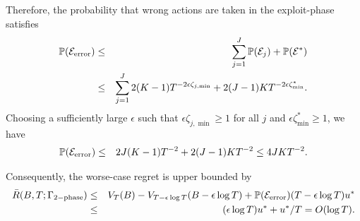 Therefore, the probability that wrong actions are taken in the exploit-phase satisfies
\begin{eqnarray}
\mathbb{P}(\mathcal{E}_{\rm error}) &\leq& \sum_{j=1}^J \mathbb{P}(\mathcal{E}_j) + \mathbb{P}(\mathcal{E}^*)\nonumber \\
&\leq& \sum_{j=1}^J 2(K-1)T^{-2 \epsilon \zeta_{j, \min}} + 2(J-1)K T^{-2\epsilon \zeta^*_{\min}}.
\end{eqnarray}
Choosing a sufficiently large $\epsilon$ such that $\epsilon \zeta_{j, \min} \geq 1$ for all $j$ and $\epsilon \zeta^*_{\min}\geq 1$, we have
\begin{eqnarray}
\mathbb{P}(\mathcal{E}_{\rm error}) &\leq& 2 J(K-1)T^{-2} + 2 (J-1)KT^{-2} \leq 4JK T^{-2}.
\end{eqnarray}

Consequently, the worse-case regret is upper bounded by
\begin{eqnarray}
\bar{R}(B, T; \Gamma_{\rm 2-phase}) &\leq& V_{T}(B) - V_{T-\epsilon \log T}(B - \epsilon \log T) + \mathbb{P}(\mathcal{E}_{\rm error})(T-\epsilon\log T)u^* \nonumber \\
&\leq& (\epsilon \log T)u^* + u^*/T = O(\log T).
\end{eqnarray} 